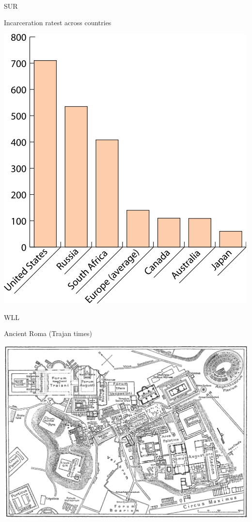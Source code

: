 \begin{chart}{S}{UR}
\caption{Incarceration ratest across countries}
\label{chart:incarceration}
\includegraphics[width=\chartwidth,height=\chartheight]{incarceration}  
\end{chart}

\begin{map}{W}{LL}
\caption{Ancient Roma  (Trajan times)}
\label{map:roma}
\includegraphics[width=\chartwidth,height=\chartheight]{Rome}
\end{map}
%
%
%
